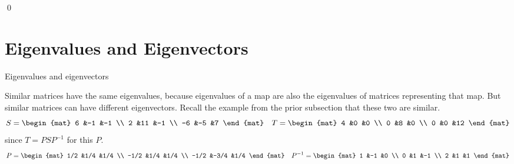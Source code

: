 \documentclass[10pt,t]{beamer}
\begin{document}
\begin{frame}
\lm[lm:DiagIffBasisOfEigens]

\pause
\pf
{}  
\qed
\end{frame}




\section{Eigenvalues and Eigenvectors}
\begin{frame}{Eigenvalues and eigenvectors}

\pause
\df[df:EigenOfMatrix]

\no
Similar matrices have the same eigenvalues, because
eigenvalues of a map are also the eigenvalues of matrices representing
that map.
But similar matrices can have different eigenvectors.
\ex
Recall the example from the prior subsection that these two are similar.
\begin{equation*}
  S=
  \begin{mat}
    6 &-1  &-1 \\
    2 &11  &-1 \\
   -6 &-5  &7
  \end{mat}
  \quad
  T=
  \begin{mat}
    4 &0 &0 \\
    0 &8 &0 \\
    0 &0 &12
  \end{mat}
\end{equation*}
since $T=PSP^{-1}$ for this $P$.
\begin{equation*}
  P=
  \begin{mat}
    1/2 &1/4  &1/4 \\
   -1/2 &1/4  &1/4 \\
   -1/2 &-3/4 &1/4
  \end{mat}
  \quad
  P^{-1}=
  \begin{mat}
    1 &-1 &0 \\
    0 &1 &-1 \\
    2 &1 &1
  \end{mat}
\end{equation*}
\end{frame}
\end{document}
